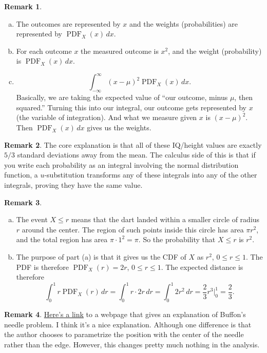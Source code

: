 \documentclass[11pt,oneside]{amsart}
\theoremstyle{definition}
\newtheorem{remark}{Remark}
\DeclareMathOperator{\PDF}{PDF}
\begin{document}
\begin{remark}
  \leavevmode\begin{enumerate}[(a)]
    \item The outcomes are represented by $x$ and the weights (probabilities) are represented by $\PDF_X(x)\,dx$.
    \item For each outcome $x$ the measured outcome is $x^2$, and the weight (probability) is $\PDF_X(x)\,dx$.
    \item \[\int_{-\infty}^\infty (x-\mu)^2\PDF_X(x)\,dx.\]
          Basically, we are taking the expected value of ``our outcome, minus $\mu$, then squared.'' Turning this into our integral, our outcome gets represented by $x$ (the variable of integration). And what we measure given $x$ is $(x-\mu)^2$. Then $\PDF_X(x)\,dx$ gives us the weights.
  \end{enumerate}
\end{remark}

\begin{remark}
  The core explanation is that all of these IQ/height values are exactly $5/3$ standard deviations away from the mean. The calculus side of this is that if you write each probability as an integral involving the normal distribution function, a $u$-substitution transforms any of these integrals into any of the other integrals, proving they have the same value.
\end{remark}

\begin{remark}
  \leavevmode\begin{enumerate}[(a)]
    \item The event $X\leq r$ means that the dart landed within a smaller circle of radius $r$ around the center. The region of such points inside this circle has area $\pi r^2$, and the total region has area $\pi\cdot 1^2=\pi$. So the probability that $X\leq r$ is $r^2$.
    \item The purpose of part (a) is that it gives us the CDF of $X$ as $r^2$, $0\leq r\leq 1$. The PDF is therefore $\PDF_X(r)=2r$, $0\leq r\leq 1$. The expected distance is therefore
    \[\int_0^1 r\PDF_X(r)\,dr=\int_0^1 r\cdot 2r\,dr=\int_0^1 2r^2\,dr=\frac 23r^3\Big|_0^1=\frac 23.\]
  \end{enumerate}
\end{remark}

\begin{remark}
  \href{https://mindyourdecisions.com/blog/2016/03/13/buffons-needle-problem-sunday-puzzle/}{Here's a link} to a webpage that gives an explanation of Buffon's needle problem. I think it's a nice explanation. Although one difference is that the author chooses to parametrize the position with the center of the needle rather than the edge. However, this changes pretty much nothing in the analysis.
\end{remark}
\end{document}
